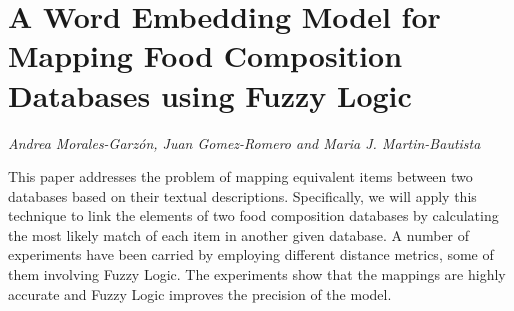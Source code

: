 \documentclass[../booklet.tex]{subfiles}
\begin{document}
\section[A Word Embedding Model for Mapping Food Composition Databases using Fuzzy Logic. {\it Andrea Morales-Garzón, Juan Gomez-Romero and Maria J. Martin-Bautista}]{A Word Embedding Model for Mapping Food Composition Databases using Fuzzy Logic}
  

\begin{center}
  {\it Andrea Morales-Garzón, Juan Gomez-Romero and Maria J. Martin-Bautista}
\end{center}

\vskip 0.8cm





This paper addresses the problem of mapping equivalent items between two databases based on their textual descriptions. Specifically, we will apply this technique to link the elements of two food composition databases by calculating the most likely match of each item in another given database. A number of experiments have been carried by employing different distance metrics, some of them involving Fuzzy Logic. The experiments show that the mappings are highly accurate and Fuzzy Logic improves the precision of the model.%


\end{document}
